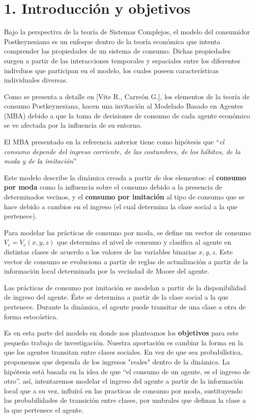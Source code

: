 \documentclass[letterpaper,12pt]{article}
\begin{document}
 
\section*{1. Introducción y objetivos}

Bajo la perspectiva de la teoría de Sistemas Complejos, el modelo del consumidor Postkeynesiano es un enfoque dentro de la teoría económica que intenta comprender las propiedades de un sistema de consumo. Dichas propiedades surgen a partir de las interacciones temporales y espaciales entre los diferentes indivduos que participan en el modelo, los cuales poseen características individuales diversas.

Como se presenta a detalle en [Vite R., Carreón G.], los elementos de la teoría de consumo Postkeynesiana, hacen una invitación al Modelado Basado en Agentes (MBA) debido a que la toma de decisiones de consumo de cada agente económico se ve afectada por la influencia de su entorno.

El MBA presentado en la referencia anterior tiene como hipótesis que ``\textit{el consumo depende del ingreso corriente, de las costumbres, de los hábitos, de la moda y de la imitación}''

Este modelo describe la dinámica creada a partir de dos elementos: el \textbf{consumo por moda} como la influencia sobre el consumo debido a la presencia  de determinados vecinos, y el \textbf{consumo por imitación} al tipo de consumo que se hace debido a cambios en el ingreso (el cual determina la clase social a la que pertenece).

Para modelar las prácticas de consumo por moda, se define un vector de consumo $V_c=V_c(x,y,z)$ que determina el nivel de consumo y clasifica al agente en distintas clases de acuerdo a los valores de las variables binarias $x,y,z$. Este vector de consumo se evoluciona a partir de reglas de actualización a partir de la información local determinada por la vecindad de Moore del agente.

Las prácticas de consumo por imitación se modelan a partir de la disponibilidad  de ingreso del agente. Éste se determina a partir de la clase social a la que pertenece. Durante la dinámica, el agente puede transitar de una clase a otra de forma estocástica.

Es en esta parte del modelo en donde nos planteamos los \textbf{objetivos} para este pequeño trabajo de investigación. Nuestra aportación es cambiar la forma en la que los agentes transitan entre clases sociales. En vez de que sea probabilística, proponemos que dependa de los ingresos "reales" dentro de la dinámica. La hipótesis está basada en la idea de que ``el consumo de un agente, es el ingreso de otro''. así,  intentaremos modelar el ingreso del agente a  partir de la información local que a su vez, influirá en las practicas de consumo por moda, sustituyendo las probabilidades de transición entre clases, por umbrales que definan la clase a la que pertenece el agente. 
\end{document}

